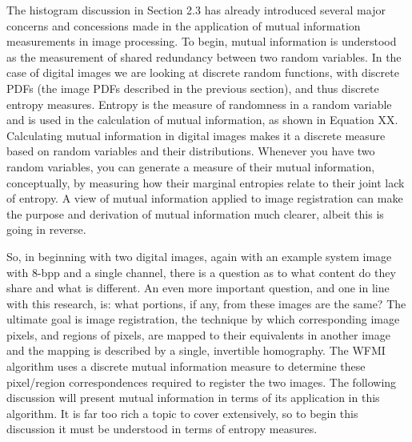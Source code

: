 %
%
%
%
%
%

%
%
%



The histogram discussion in Section 2.3 has already introduced several major concerns and concessions made in the application of mutual information measurements in image processing. To begin, mutual information is understood as the measurement of shared redundancy between two random variables. In the case of digital images we are looking at discrete random functions, with discrete PDFs (the image PDFs described in the previous section), and thus discrete entropy measures. Entropy is the measure of randomness in a random variable and is used in the calculation of mutual information, as shown in Equation XX. Calculating mutual information in digital images makes it a discrete measure based on random variables and their distributions. Whenever you have two random variables, you can generate a measure of their mutual information, conceptually, by measuring how their marginal entropies relate to their joint lack of entropy. A view of mutual information applied to image registration can make the purpose and derivation of mutual information much clearer, albeit this is going in reverse.

So, in beginning with two digital images, again with an example system image with 8-bpp and a single channel, there is a question as to what content do they share and what is different. An even more important question, and one in line with this research, is: what portions, if any, from these images are the same? The ultimate goal is image registration, the technique by which corresponding image pixels, and regions of pixels, are mapped to their equivalents in another image and the mapping is described by a single, invertible homography. The WFMI algorithm uses a discrete mutual information measure to determine these pixel/region correspondences required to register the two images. The following discussion will present mutual information in terms of its application in this algorithm. It is far too rich a topic to cover extensively, so to begin this discussion it must be understood in terms of entropy measures.

